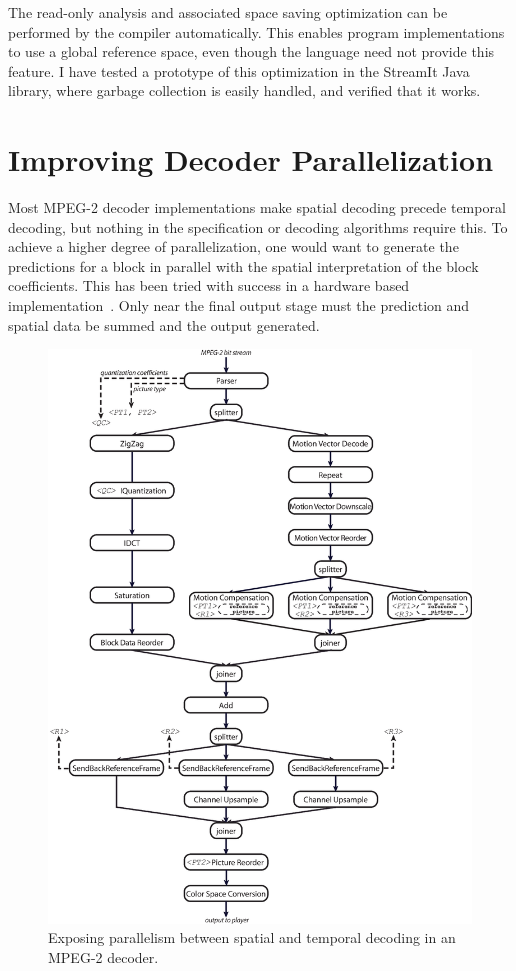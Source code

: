 The read-only analysis and associated space saving 
optimization can be performed by the compiler automatically. 
This enables program implementations to use a global 
reference space, even though the language need not provide 
this feature. I have tested a prototype of this optimization 
in the StreamIt Java library, where garbage collection is 
easily handled, and verified that it works.

\section{Improving Decoder Parallelization}
\label{section:super_parallel}

Most MPEG-2 decoder implementations make spatial decoding 
precede temporal decoding, but nothing in the specification 
or decoding algorithms require this. To achieve a higher degree of 
parallelization, one would want to generate the predictions for a 
block in parallel with the spatial interpretation of the block 
coefficients. This has been tried with success in a hardware based 
implementation~\cite{schneider99spec}. Only near the final output 
stage must the prediction and spatial data be summed and the output 
generated.

\begin{figure}
  \begin{center}
    \includegraphics[scale=0.40, angle=0]{./decoder_total_parallelization.eps}
    \caption{Exposing parallelism between spatial and temporal decoding in an MPEG-2 decoder.}
    \label{fig:total_parallelization_vs_old_way}
  \end{center}
\end{figure}

